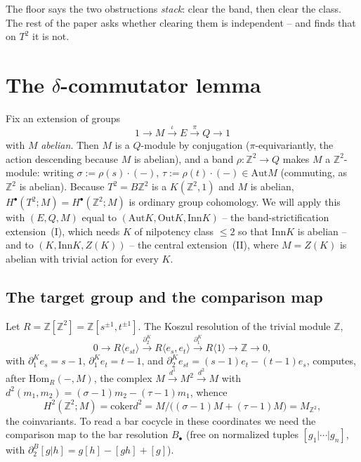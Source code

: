 \documentclass[11pt]{article}
\theoremstyle{definition}
\newcommand{\Z}{\mathbb{Z}}
\newcommand{\Aut}{\mathrm{Aut}}
\newcommand{\Inn}{\mathrm{Inn}}
\newcommand{\Out}{\mathrm{Out}}
\newcommand{\Hom}{\mathrm{Hom}}
\newcommand{\coker}{\mathrm{coker}}
\newcommand{\gp}[1]{\langle #1\rangle}
\begin{document}
The floor says the two obstructions \emph{stack}: clear the band, then clear the class. The
rest of the paper asks whether clearing them is independent -- and finds that on $T^2$ it is
not.

\section{The \texorpdfstring{$\delta$}{delta}-commutator lemma}\label{sec:lemma}

Fix an extension of groups
\begin{equation}\label{eq:gen-ext}
1\longrightarrow M\xrightarrow{\ \iota\ } E\xrightarrow{\ \pi\ } Q\longrightarrow 1
\end{equation}
with $M$ \emph{abelian}. Then $M$ is a $Q$-module by conjugation ($\pi$-equivariantly, the
action descending because $M$ is abelian), and a band $\rho\colon\Z^2\to Q$ makes $M$ a
$\Z^2$-module: writing $\sigma:=\rho(s)\cdot(-)$, $\tau:=\rho(t)\cdot(-)\in\Aut M$ (commuting,
as $\Z^2$ is abelian). Because $T^2=B\Z^2$ is a $K(\Z^2,1)$ and $M$ is abelian,
$H^\bullet(T^2;M)=H^\bullet(\Z^2;M)$ is ordinary group cohomology. We will apply this with
$(E,Q,M)$ equal to $(\Aut K,\Out K,\Inn K)$ -- the band-strictification extension~(I), which
needs $K$ of nilpotency class $\le2$ so that $\Inn K$ is abelian -- and to $(K,\Inn K,Z(K))$ --
the central extension~(II), where $M=Z(K)$ is abelian with trivial action for every $K$.

\subsection{The target group and the comparison map}\label{sub:koszul}

Let $R=\Z[\Z^2]=\Z[s^{\pm1},t^{\pm1}]$. The Koszul resolution of the trivial module $\Z$,
\[
0\to R\gp{e_{st}}\xrightarrow{\partial_2^K} R\gp{e_s,e_t}\xrightarrow{\partial_1^K}
R\gp{1}\to\Z\to0,
\]
with $\partial_1^K e_s=s-1$, $\partial_1^K e_t=t-1$, and
$\partial_2^K e_{st}=(s-1)e_t-(t-1)e_s$,
computes, after $\Hom_R(-,M)$, the complex $M\xrightarrow{d^1}M^2\xrightarrow{d^2}M$ with
$d^2(m_1,m_2)=(\sigma-1)m_2-(\tau-1)m_1$, whence
\begin{equation}\label{eq:coinv}
H^2(\Z^2;M)=\coker d^2=M\big/\big((\sigma-1)M+(\tau-1)M\big)=M_{\Z^2},
\end{equation}
the coinvariants. To read a bar cocycle in these coordinates we need the comparison map to
the bar resolution $B_\bullet$ (free on normalized tuples $[g_1|\cdots|g_n]$, with
$\partial_2^B[g|h]=g[h]-[gh]+[g]$).
\end{document}
